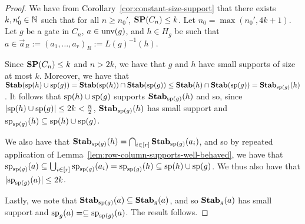 \documentclass[../paper.tex]{subfiles}
\begin{document}
\begin{proof}
  We have from Corollary~\ref{cor:constant-size-support} that there exists $k,
  n_0' \in \mathbb{N}$ such that for all $n \geq n_0'$, $\text{\textbf{SP}}(C_n) \leq k$. Let $n_0 =
  \max(n_0', 4k + 1)$. Let $g$ be a gate in $C_n$, $a \in \text{unv}(g)$, and $h
  \in H_g$ be such that $a \in \vec{a}_R := (a_1, \ldots , a_r)_R :=
  L(g)^{-1}(h)$.

  Since $\text{\textbf{SP}}(C_n) \leq k$ and $n > 2k$, we have that $g$ and $h$ have small
  supports of size at most $k$. Moreover, we have that $\text{\textbf{Stab}}(\text{sp}(h) \cup
  \text{sp}(g)) = \text{\textbf{Stab}}(\text{sp}(h)) \cap \text{\textbf{Stab}}(\text{sp}(g)) \leq \text{\textbf{Stab}}(h) \cap
  \text{\textbf{Stab}} (\text{sp} (g)) = \text{\textbf{Stab}}_{\text{sp}(g)}(h)$. It follows that $\text{sp}(h) \cup \text{sp}(g)$
  supports $\text{\textbf{Stab}}_{\text{sp}(g)}(h)$ and so, since $\vert \text{sp}(h) \cup \text{sp}(g)
  \vert \leq 2k < \frac{n}{2}$, $\text{\textbf{Stab}}_{\text{sp}(g)}(h)$ has small support and
  $\text{sp}_{\text{sp}(g)}(h) \subseteq \text{sp}(h) \cup \text{sp}(g)$.

  We also have that $\text{\textbf{Stab}}_{\text{sp}(g)}(h) = \bigcap_{i \in
    [r]}\text{\textbf{Stab}}_{\text{sp}(g)}(a_i)$, and so by repeated application of
  Lemma~\ref{lem:row-column-supports-well-behaved}, we have that
  $\text{sp}_{\text{sp}(g)}(a) \subseteq \bigcup_{i \in [r]}\text{sp}_{\text{sp}(g)}(a_i) =
  \text{sp}_{\text{sp}(g)}(h) \subseteq \text{sp}(h) \cup \text{sp}(g)$. We thus also have
  that $\vert \text{sp}_{\text{sp}(g)}(a) \vert \leq 2k$.

  Lastly, we note that $\text{\textbf{Stab}}_{\text{sp}(g)}(a) \subseteq \text{\textbf{Stab}}_g(a)$, and so
  $\text{\textbf{Stab}}_g(a)$ has small support and $\text{sp}_g(a) = \subseteq
  \text{sp}_{\text{sp}(g)}(a)$. The result follows.
\end{proof}



\end{document}
